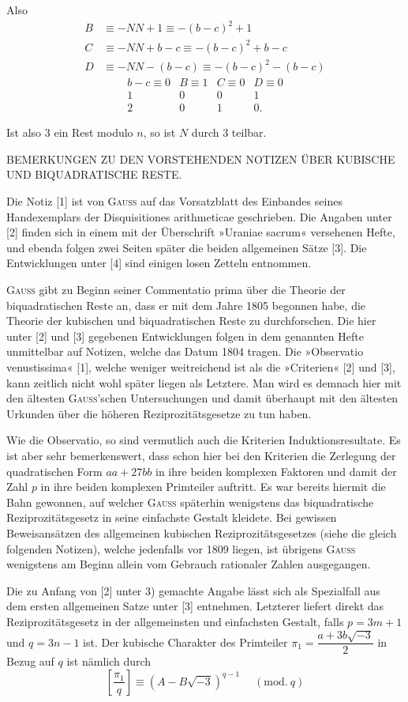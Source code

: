 \noindent\unskip{}Also
\[\begin{aligned}B&\equiv-NN+1\equiv-(b-c)^2+1\\C&\equiv-NN+b-c\equiv-(b-c)^2+b-c\\D&\equiv-NN-(b-c)\equiv-(b-c)^2-(b-c)\end{aligned}\]
\[\begin{array}{rrrr}
b-c\equiv0&B\equiv1&C\equiv0&D\equiv0\\1&0&0&1\\2&0&1&0.
\end{array}\]
\par\noindent\hspace*{\parindent}Ist also 3 ein Rest modulo $n$, so ist $N$ durch 3 teilbar.
\begingroup\small
\begin{center}BEMERKUNGEN ZU DEN VORSTEHENDEN NOTIZEN ÜBER KUBISCHE UND BIQUADRATISCHE RESTE.\end{center}
\noindent\hspace*{\parindent}Die Notiz [1] ist von \textsc{Gauss} auf das Vorsatzblatt des Einbandes seines Handexemplars der Disquisitiones arithmeticae geschrieben. Die Angaben unter [2] finden sich in einem mit der Überschrift »Uraniae sacrum« versehenen Hefte, und ebenda folgen zwei Seiten später die beiden allgemeinen Sätze [3]. Die Entwicklungen unter [4] sind einigen losen Zetteln entnommen.

\textsc{Gauss} gibt zu Beginn seiner Commentatio prima über die Theorie der biquadratischen Reste an, dass er mit dem Jahre 1805 begonnen habe, die Theorie der kubischen und biquadratischen Reste zu durchforschen. Die hier unter [2] und [3] gegebenen Entwicklungen folgen in dem genannten Hefte unmittelbar auf Notizen, welche das Datum 1804 tragen. Die »Observatio venustissima« [1], welche weniger weitreichend ist als die »Criterien« [2] und [3], kann zeitlich nicht wohl später liegen als Letztere. Man wird es demnach hier mit den ältesten \textsc{Gauss}'schen Untersuchungen und damit überhaupt mit den ältesten Urkunden über die höheren Reziprozitätsgesetze zu tun haben.

Wie die Observatio, so sind vermutlich auch die Kriterien Induktionsresultate. Es ist aber sehr bemerkenswert, dass schon hier bei den Kriterien die Zerlegung der quadratischen Form $aa+27bb$ in ihre beiden komplexen Faktoren und damit der Zahl $p$ in ihre beiden komplexen Primteiler auftritt. Es war bereits hiermit die Bahn gewonnen, auf welcher \textsc{Gauss} späterhin wenigstens das biquadratische Reziprozitätsgesetz in seine einfachste Gestalt kleidete. Bei gewissen Beweisansätzen des allgemeinen kubischen Reziprozitätsgesetzes (siehe die gleich folgenden Notizen), welche jedenfalls vor 1809 liegen, ist übrigens \textsc{Gauss} wenigstens am Beginn allein vom Gebrauch rationaler Zahlen ausgegangen.

Die zu Anfang von [2] unter 3) gemachte Angabe lässt sich als Spezialfall aus dem ersten allgemeinen Satze unter [3] entnehmen. Letzterer liefert direkt das Reziprozitätsgesetz in der allgemeinsten und einfachsten Gestalt, falls $p=3m+1$ und $q=3n-1$ ist. Der kubische Charakter des Primteiler $\pi_1=\dfrac{a+3b\sqrt{-3}}{2}$ in Bezug auf $q$ ist nämlich durch
\[\left[\frac{\pi_1}{q}\right]\equiv(A-B\sqrt{-3})^{q-1}\quad\;(\mathrm{mod.}\ q)\]
